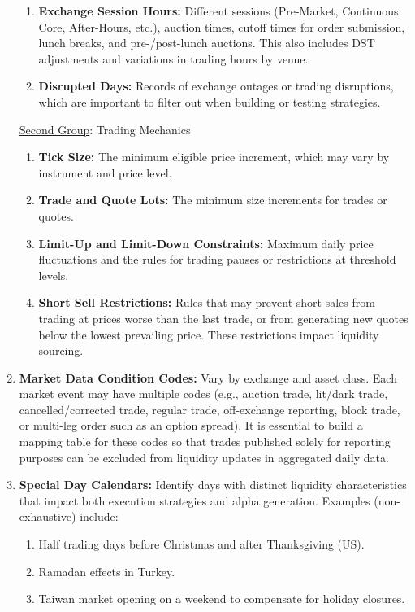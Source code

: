 \begin{definition}
\begin{enumerate}[label=\roman*.]
\begin{enumerate}[label=\arabic*.]
\item \textbf{Exchange Session Hours:} Different sessions (Pre-Market, Continuous Core, After-Hours, etc.), auction times, cutoff times for order submission, lunch breaks, and pre-/post-lunch auctions. This also includes DST adjustments and variations in trading hours by venue.
\item \textbf{Disrupted Days:} Records of exchange outages or trading disruptions, which are important to filter out when building or testing strategies.
\end{enumerate}
\underline{Second Group}: Trading Mechanics
\begin{enumerate}[label=\arabic*.]
\setlength{\itemsep}{0pt}
\item \textbf{Tick Size:} The minimum eligible price increment, which may vary by instrument and price level.
\item \textbf{Trade and Quote Lots:} The minimum size increments for trades or quotes.
\item \textbf{Limit-Up and Limit-Down Constraints:} Maximum daily price fluctuations and the rules for trading pauses or restrictions at threshold levels.
\item \textbf{Short Sell Restrictions:} Rules that may prevent short sales from trading at prices worse than the last trade, or from generating new quotes below the lowest prevailing price. These restrictions impact liquidity sourcing.
\end{enumerate}
\item \textbf{Market Data Condition Codes:} Vary by exchange and asset class. Each market event may have multiple codes (e.g., auction trade, lit/dark trade, cancelled/corrected trade, regular trade, off-exchange reporting, block trade, or multi-leg order such as an option spread). It is essential to build a mapping table for these codes so that trades published solely for reporting purposes can be excluded from liquidity updates in aggregated daily data.
\item \textbf{Special Day Calendars:} Identify days with distinct liquidity characteristics that impact both execution strategies and alpha generation. Examples (non-exhaustive) include:
\begin{enumerate}[label=\arabic*.]
\setlength{\itemsep}{0pt}
\item Half trading days before Christmas and after Thanksgiving (US).
\item Ramadan effects in Turkey.
\item Taiwan market opening on a weekend to compensate for holiday closures.

\end{enumerate}
\end{enumerate}
\end{definition}
